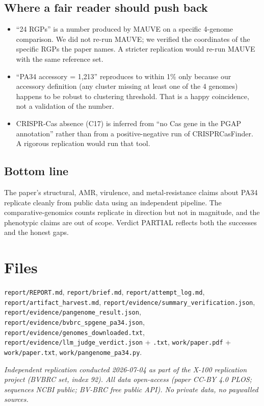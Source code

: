 \documentclass[11pt]{article}
\begin{document}
\subsection{Where a fair reader should push back}
\begin{itemize}
  \item ``24 RGPs'' is a number produced by MAUVE on a specific 4-genome comparison. We did not
        re-run MAUVE; we verified the coordinates of the specific RGPs the paper names. A stricter
        replication would re-run MAUVE with the same reference set.
  \item ``PA34 accessory = 1{,}213'' reproduces to within 1\% only because our accessory definition
        (any cluster missing at least one of the 4 genomes) happens to be robust to clustering
        threshold. That is a happy coincidence, not a validation of the number.
  \item CRISPR-Cas absence (C17) is inferred from ``no Cas gene in the PGAP annotation'' rather
        than from a positive-negative run of CRISPRCasFinder. A rigorous replication would run
        that tool.
\end{itemize}

\subsection{Bottom line}
The paper's structural, AMR, virulence, and metal-resistance claims about PA34 replicate cleanly
from public data using an independent pipeline. The comparative-genomics counts replicate in
direction but not in magnitude, and the phenotypic claims are out of scope. Verdict PARTIAL
reflects both the successes and the honest gaps.

\section{Files}
\texttt{report/REPORT.md}, \texttt{report/brief.md}, \texttt{report/attempt\_log.md},
\texttt{report/artifact\_harvest.md}, \texttt{report/evidence/summary\_verification.json},
\texttt{report/evidence/pangenome\_result.json},
\texttt{report/evidence/bvbrc\_spgene\_pa34.json},
\texttt{report/evidence/genomes\_downloaded.txt},
\texttt{report/evidence/llm\_judge\_verdict.json} + \texttt{.txt},
\texttt{work/paper.pdf} + \texttt{work/paper.txt}, \texttt{work/pangenome\_pa34.py}.

\vspace{1em}
\noindent\textit{Independent replication conducted 2026-07-04 as part of the X-100 replication
project (BVBRC set, index 92). All data open-access (paper CC-BY 4.0 PLOS; sequences NCBI public;
BV-BRC free public API). No private data, no paywalled sources.}
\end{document}
